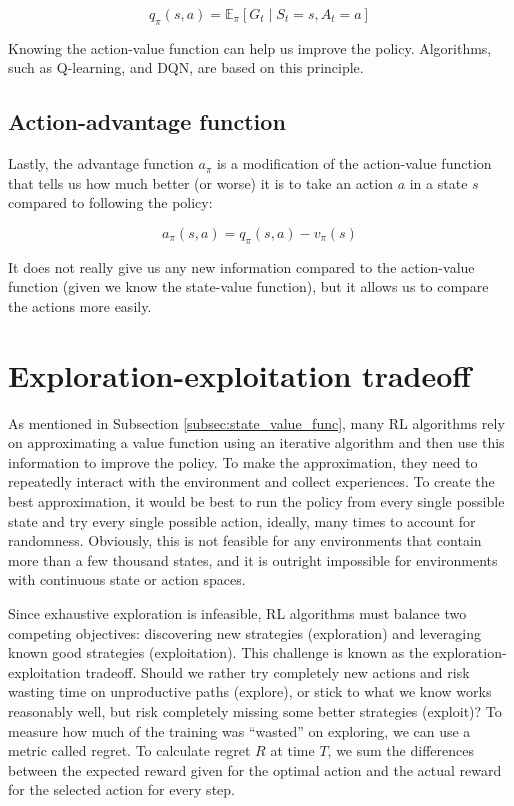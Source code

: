 \documentclass[
  digital,     %
  oneside,     %
  nosansbold,  %
  nocolorbold, %
  lof,         %
  lot,         %
]{fithesis4}
\begin{document}
\begin{equation}
q_\pi(s,a) = \mathbb{E}_\pi [G_t\mid S_t=s,A_t=a]
\end{equation}

Knowing the action-value function can help us improve the policy. Algorithms, such as Q-learning, and DQN, are based on this principle.

\subsection{Action-advantage function}

Lastly, the advantage function $a_\pi$ is a modification of the action-value function that tells us how much better (or worse) it is to take an action $a$ in a state $s$ compared to following the policy:

\begin{equation}
a_\pi(s,a) = q_\pi(s,a)-v_\pi(s)
\end{equation}

It does not really give us any new information compared to the action-value function (given we know the state-value function), but it allows us to compare the actions more easily.

\section{Exploration-exploitation tradeoff}
\label{sec:eplor-exploit}
As mentioned in Subsection \ref{subsec:state_value_func}, many RL algorithms rely on approximating a value function using an iterative algorithm and then use this information to improve the policy. To make the approximation, they need to repeatedly interact with the environment and collect experiences. To create the best approximation, it would be best to run the policy from every single possible state and try every single possible action, ideally, many times to account for randomness. Obviously, this is not feasible for any environments that contain more than a few thousand states, and it is outright impossible for environments with continuous state or action spaces.

Since exhaustive exploration is infeasible, RL algorithms must balance two competing objectives: discovering new strategies (exploration) and leveraging known good strategies (exploitation). This challenge is known as the exploration-exploitation tradeoff. Should we rather try completely new actions and risk wasting time on unproductive paths (explore), or stick to what we know works reasonably well, but risk completely missing some better strategies (exploit)? To measure how much of the training was \enquote{wasted} on exploring, we can use a metric called regret. To calculate regret $R$ at time $T$, we sum the differences between the expected reward given for the optimal action and the actual reward for the selected action for every step.
\end{document}
